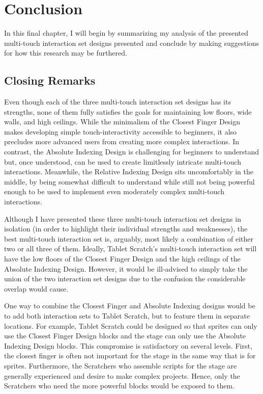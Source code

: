 \chapter{Conclusion}

In this final chapter, I will begin by summarizing my analysis of the presented multi-touch interaction set designs presented and conclude by making suggestions for how this research may be furthered.

\section{Closing Remarks}

Even though each of the three multi-touch interaction set designs has its strengths, none of them fully satisfies the goals for maintaining low floors, wide walls, and high ceilings. While the minimalism of the Closest Finger Design  makes developing simple touch-interactivity accessible to beginners, it also precludes more advanced users from creating more complex interactions. In contrast, the Absolute Indexing Design is challenging for beginners to understand but, once understood, can be used to create limitlessly intricate multi-touch interactions. Meanwhile, the Relative Indexing Design sits uncomfortably in the middle, by being somewhat difficult to understand while still not being powerful enough to be used to implement even moderately complex multi-touch interactions.

Although I have presented these three multi-touch interaction set designs in isolation (in order to highlight their individual strengths and weaknesses), the best multi-touch interaction set is, arguably, most likely a combination of either two or all three of them. Ideally, Tablet Scratch's multi-touch interaction set will have the low floors of the Closest Finger Design and the high ceilings of the Absolute Indexing Design. However, it would be ill-advised to simply take the union of the two interaction set designs due to the confusion the considerable overlap would cause.

One way to combine the Closest Finger and Absolute Indexing designs would be to add both interaction sets to Tablet Scratch, but to feature them in separate locations. For example, Tablet Scratch could be designed so that sprites can only use the Closest Finger Design blocks and the stage can only use the Absolute Indexing Design blocks. This compromise is satisfactory on several levels. First, the closest finger is often not important for the stage in the same way that is for sprites. Furthermore, the Scratchers who assemble scripts for the stage are generally experienced and desire to make complex projects. Hence, only the Scratchers who need the more powerful blocks would be exposed to them.

